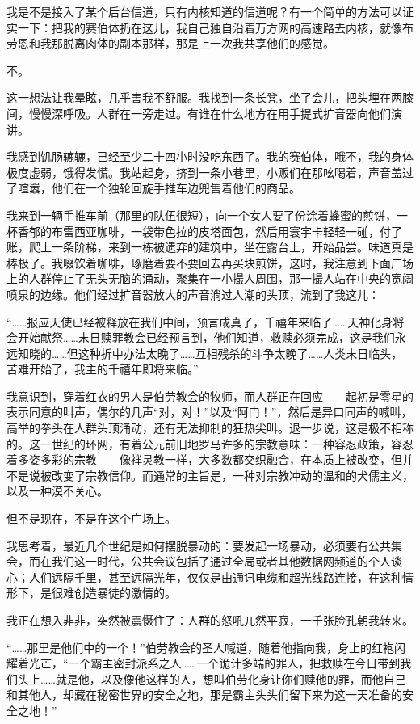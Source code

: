 \documentclass[AutoFakeBold=true]{book}
\begin{document}
我是不是接入了某个后台信道，只有内核知道的信道呢？有一个简单的方法可以证实一下：把我的赛伯体扔在这儿，我自己独自沿着万方网的高速路去内核，就像布劳恩和我那脱离肉体的副本那样，那是上一次我共享他们的感觉。

{\kaishu 不。}

这一想法让我晕眩，几乎害我不舒服。我找到一条长凳，坐了会儿，把头埋在两膝间，慢慢深呼吸。人群在一旁走过。有谁在什么地方在用手提式扩音器向他们演讲。

我感到饥肠辘辘，已经至少二十四小时没吃东西了。我的赛伯体，哦不，我的身体极度虚弱，饿得发慌。我站起身，挤到一条小巷里，小贩们在那吆喝着，声音盖过了喧嚣，他们在一个独轮回旋手推车边兜售着他们的商品。

我来到一辆手推车前（那里的队伍很短），向一个女人要了份涂着蜂蜜的煎饼，一杯香郁的布雷西亚咖啡，一袋带色拉的皮塔面包，然后用寰宇卡轻轻一碰，付了账，爬上一条阶梯，来到一栋被遗弃的建筑中，坐在露台上，开始品尝。味道真是棒极了。我啜饮着咖啡，琢磨着要不要回去再买块煎饼，这时，我注意到下面广场上的人群停止了无头无脑的涌动，聚集在一小撮人周围，那一撮人站在中央的宽阔喷泉的边缘。他们经过扩音器放大的声音淌过人潮的头顶，流到了我这儿：

``……报应天使已经被释放在我们中间，预言成真了，千禧年来临了……天神化身将会开始献祭……末日赎罪教会已经预言到，他们知道，救赎必须完成，这是我们永远知晓的……但这种折中办法太晚了……互相残杀的斗争太晚了……人类末日临头，苦难开始了，我主的千禧年即将来临。''

我意识到，穿着红衣的男人是伯劳教会的牧师，而人群正在回应——起初是零星的表示同意的叫声，偶尔的几声``对，对！''以及``阿门！''，然后是异口同声的喊叫，高举的拳头在人群头顶涌动，还有无法抑制的狂热尖叫。退一步说，这是极不相称的。这一世纪的环网，有着公元前旧地罗马许多的宗教意味：一种容忍政策，容忍着多姿多彩的宗教——像禅灵教一样，大多数都交织融合，在本质上被改变，但并不是说被改变了宗教信仰。而通常的主旨是，一种对宗教冲动的温和的犬儒主义，以及一种漠不关心。

但不是现在，不是在这个广场上。

我思考着，最近几个世纪是如何摆脱暴动的：要发起一场暴动，必须要有公共集会，而在我们这一时代，公共会议包括了通过全局或者其他数据网频道的个人谈心；人们远隔千里，甚至远隔光年，仅仅是由通讯电缆和超光线路连接，在这种情形下，是很难创造暴徒的激情的。

我正在想入非非，突然被震慑住了：人群的怒吼兀然平寂，一千张脸孔朝我转来。

``……那里是他们中的一个！''伯劳教会的圣人喊道，随着他指向我，身上的红袍闪耀着光芒，``一个霸主密封派系之人……一个诡计多端的罪人，把救赎在今日带到我们头上……就是他，以及像他这样的人，想叫伯劳化身让你们赎他的罪，而他自己和其他人，却藏在秘密世界的安全之地，那是霸主头头们留下来为这一天准备的安全之地！''
\end{document}
